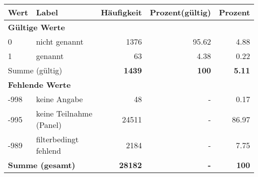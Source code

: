      \begin{longtable}{lXrrr}
     \toprule
     \textbf{Wert} & \textbf{Label} & \textbf{Häufigkeit} & \textbf{Prozent(gültig)} & \textbf{Prozent} \\
     \endhead
     \midrule
     \multicolumn{5}{l}{\textbf{Gültige Werte}}\\

     0 &
     \multicolumn{1}{X}{ nicht genannt   } &


       \num{1376} &
       \num[round-mode=places,round-precision=2]{95.62} &
         \num[round-mode=places,round-precision=2]{4.88} \\

     1 &
     \multicolumn{1}{X}{ genannt   } &


       \num{63} &
       \num[round-mode=places,round-precision=2]{4.38} &
         \num[round-mode=places,round-precision=2]{0.22} \\
     \midrule
     \multicolumn{2}{l}{Summe (gültig)} &
       \textbf{\num{1439}} &
     \textbf{100} &
       \textbf{\num[round-mode=places,round-precision=2]{5.11}} \\
     \multicolumn{5}{l}{\textbf{Fehlende Werte}}\\
       -998 &
       keine Angabe &
         \num{48} &
        - &
         \num[round-mode=places,round-precision=2]{0.17} \\
       -995 &
       keine Teilnahme (Panel) &
         \num{24511} &
        - &
         \num[round-mode=places,round-precision=2]{86.97} \\
       -989 &
       filterbedingt fehlend &
         \num{2184} &
        - &
         \num[round-mode=places,round-precision=2]{7.75} \\
     \midrule
     \multicolumn{2}{l}{\textbf{Summe (gesamt)}} &
          \textbf{\num{28182}} &
        \textbf{-} &
        \textbf{100} \\
     \bottomrule
     \end{longtable}
     
